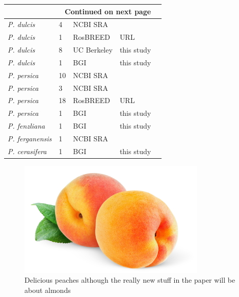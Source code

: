 \documentclass[12pt]{article}
\begin{document}
{\begin{center}
\begin{longtable}{lllll}
\hline \multicolumn{4}{r}{{Continued on next page}} \\ \hline
\endfoot

\hline \hline
\endlastfoot

                  {\em{P. dulcis}} &4 &NCBI SRA &\citealt{koepke2013comparative}\\
                  {\em{P. dulcis}} &1 &RosBREED &URL\\
                  {\em{P. dulcis}} &8 &UC Berkeley &this study \\
                  {\em{P. dulcis}} &1 &BGI &this study\\
                  {\em{P. persica}} &10 &NCBI SRA &\citealt{verde2013high} \\ %
                  {\em{P. persica}} &3 &NCBI SRA &\citealt{ahmad2011whole} \\ %
                  {\em{P. persica}} &18 &RosBREED &URL \\ %
                  {\em{P. persica}} &1 &BGI &this study \\ %
                 {\em{P. fenzliana}} &1 &BGI &this study\\
                 {\em{P. ferganensis}} &1 &NCBI SRA &\citealt{verde2013high}\\
                 {\em{P. cerasifera}} &1 &BGI &this study\\ \hline

\end{longtable}
\end{center}



\begin{figure}[b]
\centering
   \includegraphics[width=0.8\textwidth]{peachzdfgad.jpg}
  \caption{Delicious peaches although the really new stuff in the paper will be about almonds}
  \label{fig:peach}
\end{figure}



}
\end{document}
